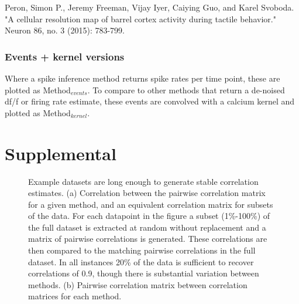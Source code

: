 \documentclass[a4paper]{article}
\begin{document}
\noindent Peron, Simon P., Jeremy Freeman, Vijay Iyer, Caiying Guo, and Karel Svoboda. "A cellular resolution map of barrel cortex activity during tactile behavior." Neuron 86, no. 3 (2015): 783-799.

\subsubsection*{Events + kernel versions}
Where a spike inference method returns spike rates per time point, these are plotted as Method$_{events}$. To compare to other methods that return a de-noised df/f or firing rate estimate, these events are convolved with a calcium kernel and plotted as Method$_{kernel}$.

\clearpage
\section{Supplemental}

\begin{figure}[h!]
\centering
{}%
\caption{\label{fig:supp_cxy_stability}Example datasets are long enough to generate stable correlation estimates. (a) Correlation between the pairwise correlation matrix for a given method, and an equivalent correlation matrix for subsets of the data. For each datapoint in the figure a subset (1\%-100\%) of the full dataset is extracted at random without replacement and a matrix of pairwise correlations is generated. These correlations are then compared to the matching pairwise correlations in the full dataset. In all instances 20\% of the data is sufficient to recover correlations of 0.9, though there is substantial variation between methods. (b) Pairwise correlation matrix between correlation matrices for each method.}
\end{figure} %
\end{document}

